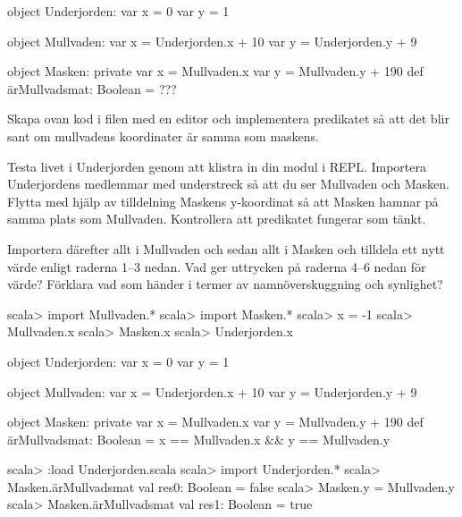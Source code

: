 \begin{Code}
object Underjorden:
  var x = 0
  var y = 1

  object Mullvaden:
    var x = Underjorden.x + 10
    var y = Underjorden.y + 9

  object Masken:
    private var x = Mullvaden.x
    var y = Mullvaden.y + 190
    def ärMullvadsmat: Boolean = ???
\end{Code}

\Subtask Skapa ovan kod i filen  med en editor och implementera predikatet   så att det blir sant om mullvadens koordinater är samma som maskens.

\Subtask Testa livet i Underjorden genom att klistra in din modul i REPL. Importera Underjordens medlemmar med understreck så att du ser Mullvaden och Masken. Flytta med hjälp av tilldelning Maskens y-koordinat så att Masken hamnar på samma plats som Mullvaden. Kontrollera att predikatet  fungerar som tänkt.

 \Subtask Importera därefter allt i Mullvaden och sedan allt i Masken och tilldela  ett nytt värde enligt raderna 1--3 nedan. Vad ger uttrycken på raderna 4--6 nedan för värde? Förklara vad som händer i termer av namnöverskuggning och synlighet?

\begin{REPL}
scala> import Mullvaden.*
scala> import Masken.*
scala> x = -1
scala> Mullvaden.x
scala> Masken.x
scala> Underjorden.x
\end{REPL}

\SOLUTION

\TaskSolved \what

\SubtaskSolved

\begin{Code}
object Underjorden:
  var x = 0
  var y = 1

  object Mullvaden:
    var x = Underjorden.x + 10
    var y = Underjorden.y + 9

  object Masken:
    private var x = Mullvaden.x
    var y = Mullvaden.y + 190
    def ärMullvadsmat: Boolean = x == Mullvaden.x && y == Mullvaden.y
\end{Code}

\SubtaskSolved

\begin{REPL}
scala> :load Underjorden.scala
scala> import Underjorden.*
scala> Masken.ärMullvadsmat
val res0: Boolean = false
scala> Masken.y = Mullvaden.y
scala> Masken.ärMullvadsmat
val res1: Boolean = true
\end{REPL}


